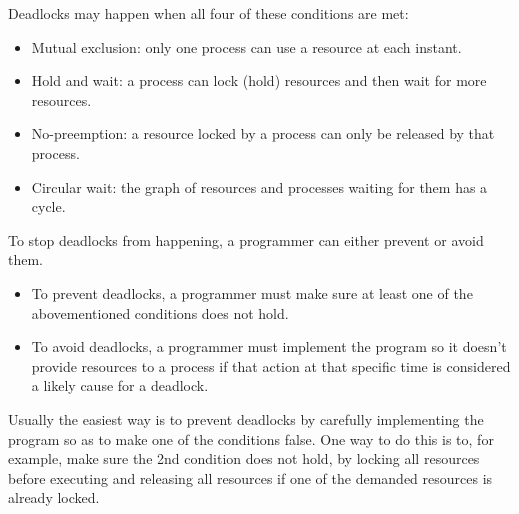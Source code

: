 \documentclass{sope}
\begin{document}
Deadlocks may happen when all four of these conditions are met:
\begin{itemize}
    \item Mutual exclusion: only one process can use a resource at each instant.
    \item Hold and wait: a process can lock (hold) resources and then wait for more resources.
    \item No-preemption: a resource locked by a process can only be released by that process.
    \item Circular wait: the graph of resources and processes waiting for them has a cycle.
\end{itemize}
To stop deadlocks from happening, a programmer can either prevent or avoid them.
\begin{itemize}
    \item To prevent deadlocks, a programmer must make sure at least one of the abovementioned conditions does not hold.
    \item To avoid deadlocks, a programmer must implement the program so it doesn't provide resources to a process if that action at that specific time is considered a likely cause for a deadlock.
\end{itemize}
Usually the easiest way is to prevent deadlocks by carefully implementing the program so as to make one of the conditions false. One way to do this is to, for example, make sure the 2nd condition does not hold, by locking all resources before executing and releasing all resources if one of the demanded resources is already locked.
\end{document}
